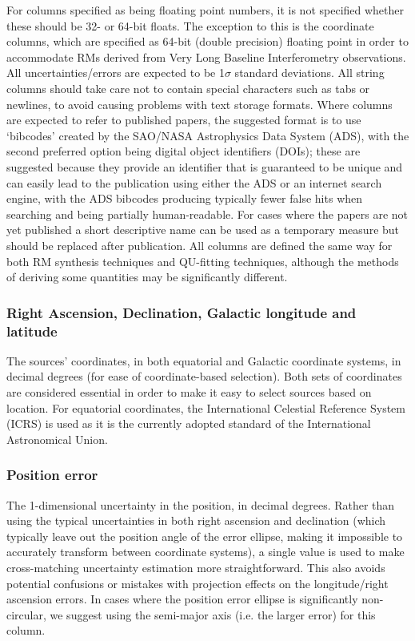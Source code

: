 \documentclass[10pt,modern]{aastex63}
\begin{document}
For columns specified as being floating point numbers, it is not specified whether these should be 32- or 64-bit floats. The exception to this is the coordinate columns, which are specified as 64-bit (double precision) floating point in order to accommodate RMs derived from Very Long Baseline Interferometry observations.
All uncertainties/errors are expected to be 1$\sigma$ standard deviations. All string columns should take care not to contain special characters such as tabs or newlines, to avoid causing problems with text storage formats.
Where columns are expected to refer to published papers, the suggested format is to use `bibcodes' created by the SAO/NASA Astrophysics Data System (ADS), with the second preferred option being digital object identifiers (DOIs); these are suggested because they provide an identifier that is guaranteed to be unique and can easily lead to the publication using either the ADS or an internet search engine, with the ADS bibcodes producing typically fewer false hits when searching and being partially human-readable. For cases where the papers are not yet published a short descriptive name can be used as a temporary measure but should be replaced after publication.
All columns are defined the same way for both RM synthesis techniques and QU-fitting techniques, although the methods of deriving some quantities may be significantly different.

\subsubsection{Right Ascension, Declination, Galactic longitude and latitude}
The sources' coordinates, in both equatorial and Galactic coordinate systems, in decimal degrees (for ease of coordinate-based selection). Both sets of coordinates are considered essential in order to make it easy to select sources based on location. For equatorial coordinates, the International Celestial Reference System (ICRS) is used as it is the currently adopted standard of the International Astronomical Union.


\subsubsection{Position error}
The 1-dimensional uncertainty in the position, in decimal degrees. Rather than using the typical uncertainties in both right ascension and declination (which typically leave out the position angle of the error ellipse, making it impossible to accurately transform between coordinate systems), a single value is used to make cross-matching uncertainty estimation more straightforward. This also avoids potential confusions or mistakes with projection effects on the longitude/right ascension errors. In cases where the position error ellipse is significantly non-circular, we suggest using the semi-major axis (i.e. the larger error) for this column.
\end{document}

